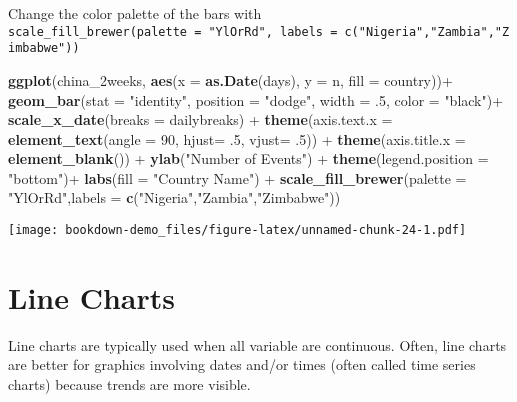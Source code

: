 \documentclass[]{book}
\newenvironment{Shaded}{\begin{snugshade}}{\end{snugshade}}
\newcommand{\KeywordTok}[1]{\textcolor[rgb]{0.13,0.29,0.53}{\textbf{{#1}}}}
\newcommand{\DataTypeTok}[1]{\textcolor[rgb]{0.13,0.29,0.53}{{#1}}}
\newcommand{\DecValTok}[1]{\textcolor[rgb]{0.00,0.00,0.81}{{#1}}}
\newcommand{\StringTok}[1]{\textcolor[rgb]{0.31,0.60,0.02}{{#1}}}
\newcommand{\NormalTok}[1]{{#1}}
\theoremstyle{definition}
\theoremstyle{definition}
\theoremstyle{remark}
\begin{document}
Change the color palette of the bars with
\texttt{scale\_fill\_brewer(palette\ =\ "YlOrRd",\ labels\ =\ c("Nigeria","Zambia","Zimbabwe"))}

\begin{Shaded}
\begin{Highlighting}[]
\KeywordTok{ggplot}\NormalTok{(china_2weeks, }\KeywordTok{aes}\NormalTok{(}\DataTypeTok{x =} \KeywordTok{as.Date}\NormalTok{(days), }\DataTypeTok{y =} \NormalTok{n, }\DataTypeTok{fill =} \NormalTok{country))+}
\StringTok{  }\KeywordTok{geom_bar}\NormalTok{(}\DataTypeTok{stat =} \StringTok{"identity"}\NormalTok{, }\DataTypeTok{position =} \StringTok{"dodge"}\NormalTok{, }\DataTypeTok{width =} \NormalTok{.}\DecValTok{5}\NormalTok{, }\DataTypeTok{color =} \StringTok{"black"}\NormalTok{)+}
\StringTok{  }\KeywordTok{scale_x_date}\NormalTok{(}\DataTypeTok{breaks =} \NormalTok{dailybreaks) +}
\StringTok{  }\KeywordTok{theme}\NormalTok{(}\DataTypeTok{axis.text.x =} \KeywordTok{element_text}\NormalTok{(}\DataTypeTok{angle =} \DecValTok{90}\NormalTok{, }\DataTypeTok{hjust=} \NormalTok{.}\DecValTok{5}\NormalTok{, }\DataTypeTok{vjust=} \NormalTok{.}\DecValTok{5}\NormalTok{)) +}
\StringTok{  }\KeywordTok{theme}\NormalTok{(}\DataTypeTok{axis.title.x =} \KeywordTok{element_blank}\NormalTok{()) +}
\StringTok{  }\KeywordTok{ylab}\NormalTok{(}\StringTok{"Number of Events"}\NormalTok{) +}
\StringTok{  }\KeywordTok{theme}\NormalTok{(}\DataTypeTok{legend.position =} \StringTok{"bottom"}\NormalTok{)+}
\StringTok{  }\KeywordTok{labs}\NormalTok{(}\DataTypeTok{fill =} \StringTok{"Country Name"}\NormalTok{) +}
\StringTok{  }\KeywordTok{scale_fill_brewer}\NormalTok{(}\DataTypeTok{palette =} \StringTok{"YlOrRd"}\NormalTok{,}\DataTypeTok{labels =} \KeywordTok{c}\NormalTok{(}\StringTok{"Nigeria"}\NormalTok{,}\StringTok{"Zambia"}\NormalTok{,}\StringTok{"Zimbabwe"}\NormalTok{))}
\end{Highlighting}
\end{Shaded}

\texttt{[image: bookdown-demo\_files/figure-latex/unnamed-chunk-24-1.pdf]}

\chapter{Line Charts}\label{line-charts}

Line charts are typically used when all variable are continuous. Often,
line charts are better for graphics involving dates and/or times (often
called time series charts) because trends are more visible.
\end{document}
